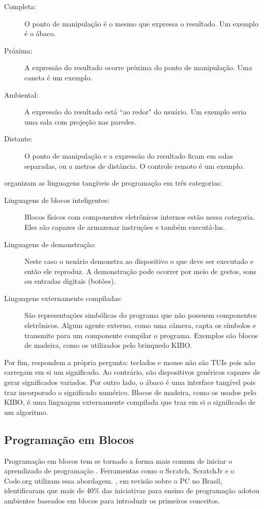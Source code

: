 \begin{description}
    \item[Completa:] O ponto de manipulação é o mesmo que expressa o resultado. Um exemplo é o ábaco.
    \item[Próxima:] A expressão do resultado ocorre próxima do ponto de manipulação. Uma caneta é um exemplo.
    \item[Ambiental:] A expressão do resultado está “ao redor" do usuário. Um exemplo seria uma sala com projeção nas paredes.
    \item[Distante:] O ponto de manipulação e a expressão do resultado ficam em salas separadas, ou a metros de distância. O controle remoto é um exemplo.
\end{description}

 organizam as linguagens tangíveis de programação em três categorias:

\begin{description}
    \item[Linguagens de blocos inteligentes:] Blocos físicos com componentes eletrônicos internos estão nessa categoria. Eles são capazes de armazenar instruções e também executá-las.
    
    \item[Linguagens de demonstração:] Neste caso o usuário demonstra ao dispositivo o que deve ser executado e então ele reproduz. A demonstração pode ocorrer por meio de gestos, sons ou entradas digitais (botões).
    
    \item[Linguagens externamente compiladas:] São representações simbólicas do programa que não possuem componentes eletrônicos. Algum agente externo, como uma câmera, capta os símbolos e transmite para um componente compilar o programa. Exemplos são blocos de madeira, como os utilizados pelo brinquedo KIBO.
\end{description}

Por fim,  respondem a própria pergunta: teclados e mouse não são TUIs pois não carregam em si um significado. Ao contrário, são dispositivos genéricos capazes de gerar significados variados. Por outro lado, o ábaco é uma interface tangível pois traz incorporado o significado numérico. Blocos de madeira, como os usados pelo KIBO, é uma linguagem externamente compilada que traz em si o significado de um algoritmo.

\subsection{Programação em Blocos}
\label{sec_prog_blocos}
Programação em blocos tem se tornado a forma mais comum de iniciar o aprendizado de programação \cite{weintrop_block-based_2019}. Ferramentas como o Scratch, ScratchJr e o Code.org utilizam essa abordagem. , em revisão sobre o \acl{PC} no Brasil, identificaram que mais de 40\% das iniciativas para ensino de programação adotou ambientes baseados em blocos para introduzir os primeiros conceitos.

